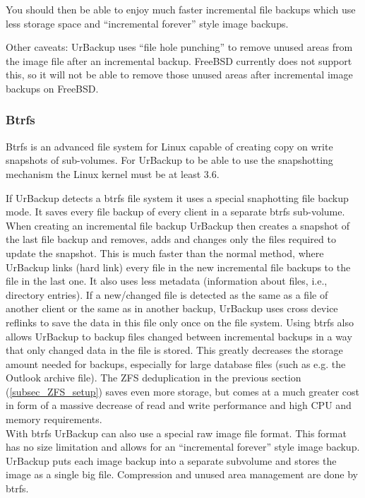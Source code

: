 \documentclass[a4paper,10pt]{article}
\begin{document}
\noindent You should then be able to enjoy much faster incremental file backups which use less storage space
and ``incremental forever'' style image backups.

Other caveats: UrBackup uses ``file hole punching'' to remove unused areas from the image file
after an incremental backup. FreeBSD currently does not support this, so it will not be able
to remove those unused areas after incremental image backups on FreeBSD.

\subsubsection{Btrfs}
\label{subsec_btrfs_setup}

Btrfs is an advanced file system for Linux capable of creating copy on write
snapshots of sub-volumes. For UrBackup to be
able to use the snapshotting mechanism the Linux kernel must be at least 3.6.

If UrBackup detects a btrfs file system it uses a special snaphotting file backup
mode. It saves every file backup of every client in a separate btrfs sub-volume.
When creating an incremental file backup UrBackup then creates a snapshot of the
last file backup and removes, adds and changes only the files required to update
the snapshot. This is much faster than the normal method, where UrBackup links
(hard link) every file in the new incremental file backups to the file in the
last one. It also uses less metadata (information about files, i.e., directory
entries). If a new/changed file is detected as the same as a file of another
client or the same as in another backup, UrBackup uses cross device reflinks to
save the data in this file only once on the file system. Using btrfs also allows
UrBackup to backup files changed between incremental backups in a way that only
changed data in the file is stored. This greatly decreases the storage amount
needed for backups, especially for large database files (such as e.g. the
Outlook archive file). The ZFS deduplication in the previous section
(\ref{subsec_ZFS_setup}) saves even more storage, but comes at a much greater
cost in form of a massive decrease of read and write performance and high CPU and
memory requirements.\\

With btrfs UrBackup can also use a special raw image file format. This format has
no size limitation and allows for an ``incremental forever'' style image backup.
UrBackup puts each image backup into a separate subvolume and stores the image
as a single big file. Compression and unused area management are done by btrfs.
\end{document}
